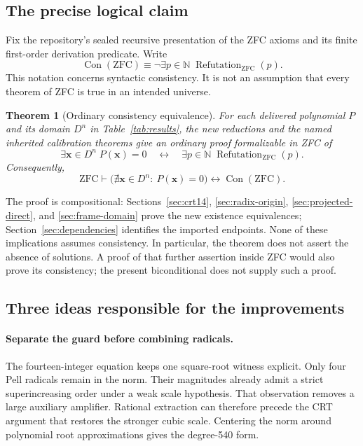 \documentclass[11pt,a4paper]{article}
\newtheorem{theorem}{Theorem}[section]
\theoremstyle{definition}
\DeclareMathOperator{\Con}{Con}
\begin{document}
\subsection{The precise logical claim}

Fix the repository's sealed recursive presentation of the ZFC axioms and
its finite first-order derivation predicate. Write
\[
 \Con(\mathrm{ZFC})\equiv
 \neg\exists p\in\mathbb N\;
       \operatorname{Refutation}_{\mathrm{ZFC}}(p).
\]
This notation concerns syntactic consistency. It is not an assumption
that every theorem of ZFC is true in an intended universe.

\begin{theorem}[Ordinary consistency equivalence]
\label{thm:main}
For each delivered polynomial $P$ and its domain $D^n$ in
Table~\ref{tab:results}, the new reductions and the named inherited
calibration theorems give an ordinary proof formalizable in ZFC of
\[
 \exists\mathbf x\in D^n\;P(\mathbf x)=0
 \quad\longleftrightarrow\quad
 \exists p\in\mathbb N\;
       \operatorname{Refutation}_{\mathrm{ZFC}}(p).
\]
Consequently,
\[
 \boxed{\mathrm{ZFC}\vdash
  \bigl(\nexists\mathbf x\in D^n:\ P(\mathbf x)=0\bigr)
        \longleftrightarrow\Con(\mathrm{ZFC}).}
\]
\end{theorem}

The proof is compositional: Sections~\ref{sec:crt14},
\ref{sec:radix-origin}, \ref{sec:projected-direct}, and
\ref{sec:frame-domain} prove the new existence equivalences;
Section~\ref{sec:dependencies} identifies the imported endpoints. None of
these implications assumes consistency. In particular, the theorem does
not assert the absence of solutions. A proof of that further assertion
inside ZFC would also prove its consistency; the present biconditional
does not supply such a proof.

\subsection{Three ideas responsible for the improvements}

\paragraph{Separate the guard before combining radicals.}
The fourteen-integer equation keeps one square-root witness explicit.
Only four Pell radicals remain in the norm. Their magnitudes already
admit a strict superincreasing order under a weak scale hypothesis.
That observation removes a large auxiliary amplifier. Rational extraction
can therefore precede the CRT argument that restores the stronger cubic
scale. Centering the norm around polynomial root approximations gives
the degree-540 form.
\end{document}

